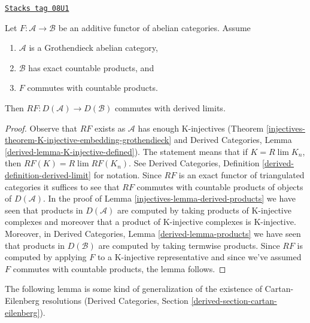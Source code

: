 \begin{lemma}
\label{injectives-lemma-RF-commutes-with-Rlim}
\href{https://stacks.math.columbia.edu/tag/08U1}{\texttt{Stacks tag 08U1}}

Let $F : \mathcal{A} \to \mathcal{B}$ be an additive functor of
abelian categories. Assume
\begin{enumerate}
\item $\mathcal{A}$ is a Grothendieck abelian category,
\item $\mathcal{B}$ has exact countable products, and
\item $F$ commutes with countable products.
\end{enumerate}
Then
$RF : D(\mathcal{A}) \to D(\mathcal{B})$ commutes with derived limits.
\end{lemma}

\begin{proof}

Observe that $RF$ exists as $\mathcal{A}$ has enough K-injectives
(Theorem \ref{injectives-theorem-K-injective-embedding-grothendieck}
and
Derived Categories, Lemma \ref{derived-lemma-K-injective-defined}).
The statement means that if $K = R\lim K_n$, then
$RF(K) = R\lim RF(K_n)$. See
Derived Categories, Definition \ref{derived-definition-derived-limit}
for notation. Since $RF$ is an exact functor of triangulated
categories it suffices to see that $RF$ commutes with countable
products of objects of $D(\mathcal{A})$. In the proof of
Lemma \ref{injectives-lemma-derived-products}
we have seen that products in $D(\mathcal{A})$ are computed by
taking products of K-injective complexes and moreover that a
product of K-injective complexes is K-injective.
Moreover, in Derived Categories, Lemma
\ref{derived-lemma-products}
we have seen that products in $D(\mathcal{B})$ are computed
by taking termwise products.
Since $RF$ is computed by applying $F$ to a K-injective
representative and since we've assumed $F$ commutes with
countable products, the lemma follows.
\end{proof}

The following lemma is some kind of generalization of
the existence of Cartan-Eilenberg resolutions
(Derived Categories, Section \ref{derived-section-cartan-eilenberg}).

